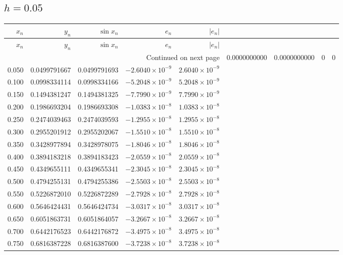 \documentclass[11pt,a4paper]{article}
\begin{document}
\subsection{\texorpdfstring{$h=0.05$}{h=0.05}}
\begingroup\footnotesize\setlength{\tabcolsep}{5pt}
\begin{longtable}{rrrrr}
\toprule $x_n$ & $y_n$ & $\sin x_n$ & $e_n$ & $|e_n|$ \\ \midrule
\endfirsthead
\toprule $x_n$ & $y_n$ & $\sin x_n$ & $e_n$ & $|e_n|$ \\ \midrule
\endhead\midrule\multicolumn{5}{r}{Continued on next page}\endfoot\bottomrule\endlastfoot
0.000 & 0.0000000000 & 0.0000000000 & $0$ & $0$ \\
0.050 & 0.0499791667 & 0.0499791693 & $-2.6040\times 10^{-9}$ & $2.6040\times 10^{-9}$ \\
0.100 & 0.0998334114 & 0.0998334166 & $-5.2048\times 10^{-9}$ & $5.2048\times 10^{-9}$ \\
0.150 & 0.1494381247 & 0.1494381325 & $-7.7990\times 10^{-9}$ & $7.7990\times 10^{-9}$ \\
0.200 & 0.1986693204 & 0.1986693308 & $-1.0383\times 10^{-8}$ & $1.0383\times 10^{-8}$ \\
0.250 & 0.2474039463 & 0.2474039593 & $-1.2955\times 10^{-8}$ & $1.2955\times 10^{-8}$ \\
0.300 & 0.2955201912 & 0.2955202067 & $-1.5510\times 10^{-8}$ & $1.5510\times 10^{-8}$ \\
0.350 & 0.3428977894 & 0.3428978075 & $-1.8046\times 10^{-8}$ & $1.8046\times 10^{-8}$ \\
0.400 & 0.3894183218 & 0.3894183423 & $-2.0559\times 10^{-8}$ & $2.0559\times 10^{-8}$ \\
0.450 & 0.4349655111 & 0.4349655341 & $-2.3045\times 10^{-8}$ & $2.3045\times 10^{-8}$ \\
0.500 & 0.4794255131 & 0.4794255386 & $-2.5503\times 10^{-8}$ & $2.5503\times 10^{-8}$ \\
0.550 & 0.5226872010 & 0.5226872289 & $-2.7928\times 10^{-8}$ & $2.7928\times 10^{-8}$ \\
0.600 & 0.5646424431 & 0.5646424734 & $-3.0317\times 10^{-8}$ & $3.0317\times 10^{-8}$ \\
0.650 & 0.6051863731 & 0.6051864057 & $-3.2667\times 10^{-8}$ & $3.2667\times 10^{-8}$ \\
0.700 & 0.6442176523 & 0.6442176872 & $-3.4975\times 10^{-8}$ & $3.4975\times 10^{-8}$ \\
0.750 & 0.6816387228 & 0.6816387600 & $-3.7238\times 10^{-8}$ & $3.7238\times 10^{-8}$ \\

\end{longtable}
\end{document}

